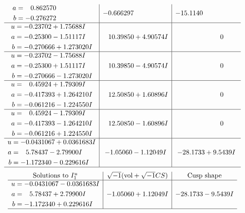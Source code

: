 \documentclass[1p]{elsarticle_modified}
\theoremstyle{definition}
\newcommand{\I}{\sqrt{-1}}
\begin{document}
$$\begin{array}{c|c|c}
\begin{aligned}
a &= \phantom{-}0.862570\phantom{ +0.000000I} \\
b &= -0.276272\phantom{ +0.000000I}\end{aligned}
 & -0.666297\phantom{ +0.000000I} & -15.1140\phantom{ +0.000000I} \\ \hline\begin{aligned}
u &= -0.23702 + 1.75688 I \\
a &= -0.25300 - 1.51117 I \\
b &= -0.270666 + 1.273020 I\end{aligned}
 & \phantom{-}10.39850 + 4.90574 I & \phantom{-0.000000 } 0 \\ \hline\begin{aligned}
u &= -0.23702 - 1.75688 I \\
a &= -0.25300 + 1.51117 I \\
b &= -0.270666 - 1.273020 I\end{aligned}
 & \phantom{-}10.39850 - 4.90574 I & \phantom{-0.000000 } 0 \\ \hline\begin{aligned}
u &= \phantom{-}0.45924 + 1.79309 I \\
a &= -0.417393 + 1.264210 I \\
b &= -0.061216 - 1.224550 I\end{aligned}
 & \phantom{-}12.50850 + 1.60896 I & \phantom{-0.000000 } 0 \\ \hline\begin{aligned}
u &= \phantom{-}0.45924 - 1.79309 I \\
a &= -0.417393 - 1.264210 I \\
b &= -0.061216 + 1.224550 I\end{aligned}
 & \phantom{-}12.50850 - 1.60896 I & \phantom{-0.000000 } 0 \\ \hline\begin{aligned}
u &= -0.0431067 + 0.0361683 I \\
a &= \phantom{-}5.78437 - 2.79900 I \\
b &= -1.172340 - 0.229616 I\end{aligned}
 & -1.05060 - 1.12049 I & -28.1733 + 9.5439 I\\
 \hline 
 \end{array}$$\newpage$$\begin{array}{c|c|c}  
\text{Solutions to }I^u_{1}& \I (\text{vol} + \sqrt{-1}CS) & \text{Cusp shape}\\
 \hline 
\begin{aligned}
u &= -0.0431067 - 0.0361683 I \\
a &= \phantom{-}5.78437 + 2.79900 I \\
b &= -1.172340 + 0.229616 I\end{aligned}
 & -1.05060 + 1.12049 I & -28.1733 - 9.5439 I\\
 \hline 
 \end{array}$$\newpage\newpage\renewcommand{\arraystretch}{1}
\end{document}
